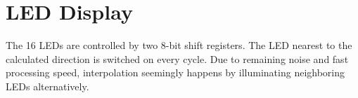 \section{LED Display}
\label{sec::display}

The 16 LEDs are controlled by two 8-bit shift registers.
The LED nearest to the calculated direction is switched on every cycle.
Due to remaining noise and fast processing speed, interpolation seemingly happens by illuminating neighboring LEDs alternatively.